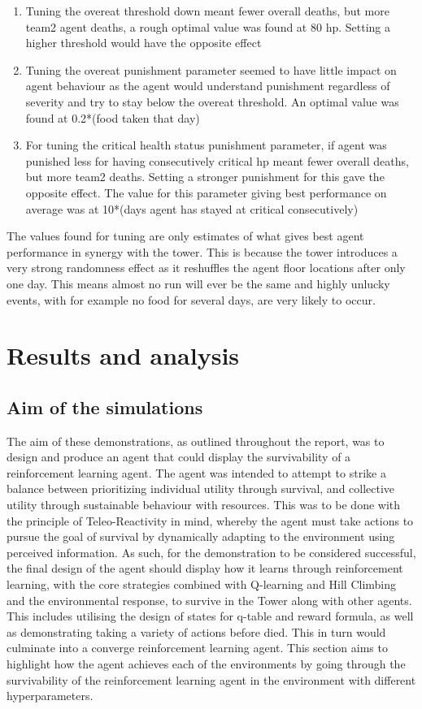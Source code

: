 \begin{enumerate}
	\item Tuning the overeat threshold down meant fewer overall deaths, but more team2 agent deaths, a rough optimal value was found at 80 hp. Setting a higher threshold would have the opposite effect
	\item Tuning the overeat punishment parameter seemed to have little impact on agent behaviour as the agent would understand punishment regardless of severity and try to stay below the overeat threshold. An optimal value was found at 0.2*(food taken that day)
	\item For tuning the critical health status punishment parameter, if agent was punished less for having consecutively critical hp meant fewer overall deaths, but more team2 deaths. Setting a stronger punishment for this gave the opposite effect. The value for this parameter giving best performance on average was at 10*(days agent has stayed at critical consecutively)
\end{enumerate}

The values found for tuning are only estimates of what gives best agent performance in synergy with the tower. This is because the tower introduces a very strong randomness effect as it reshuffles the agent floor locations after only one day. This means almost no run will ever be the same and highly unlucky events, with for example no food for several days, are very likely to occur. 

\section{Results and analysis}
\subsection{Aim of the simulations}
The aim of these demonstrations, as outlined throughout the report, was to design and produce an agent that could display the survivability of a reinforcement learning agent. The agent was intended to attempt to strike a balance between prioritizing individual utility through survival, and collective utility through sustainable behaviour with resources. This was to be done with the principle of Teleo-Reactivity in mind, whereby the agent must take actions to pursue the goal of survival by dynamically adapting to the environment using perceived information. As such, for the demonstration to be considered successful, the final design of the agent should display how it learns through reinforcement learning, with the core strategies combined with Q-learning and Hill Climbing and the environmental response, to survive in the Tower along with other agents. This includes utilising the design of states for q-table and reward formula, as well as demonstrating taking a variety of actions before died. This in turn would culminate into a converge reinforcement learning agent. This section aims to highlight how the agent achieves each of the environments by going through the survivability of the reinforcement learning agent in the environment with different hyperparameters. 

